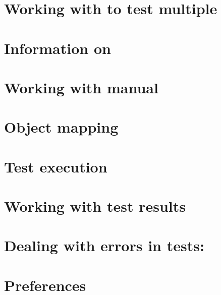 \clearpage 

\section{Working with \gdjobs{} to test multiple \gdauts{}}
\label{WorkingWithJobs}


\clearpage 

\section{Information on \gdsteps{}}


\section{Working with manual \gdcases{}}


\clearpage

\section{Object mapping}


\clearpage

\section{Test execution}
\label{TestExec}


\clearpage

\section{Working with test results}


\clearpage

\section{Dealing with errors in tests: \gdehandlers{}}
\label{customizedehandler}


\clearpage
\section{Preferences}
\label{ConfigurePrefs}


